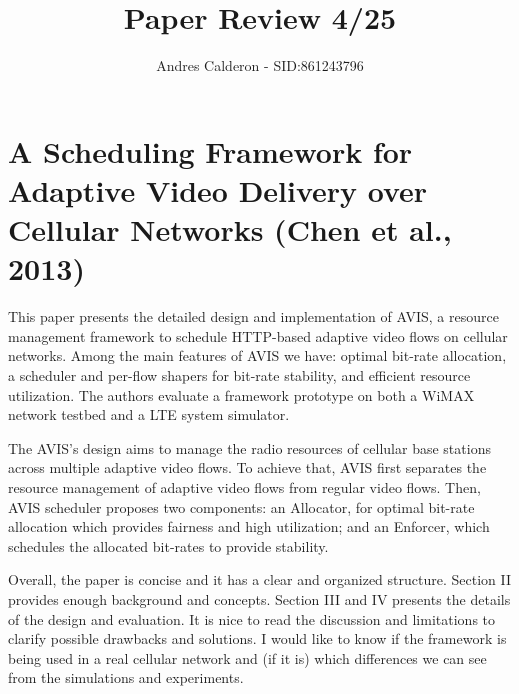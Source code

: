 \documentclass[a4paper,10pt]{scrartcl}
\title{Paper Review 4/25}
\author{Andres Calderon - SID:861243796}
\begin{document}
\maketitle
\thispagestyle{empty}

\section*{A Scheduling Framework for Adaptive Video Delivery over Cellular Networks (Chen et al., 2013)}
This paper presents the detailed design and implementation of AVIS, a resource management framework to schedule HTTP-based adaptive video flows on cellular networks. Among the main features of AVIS we have: optimal bit-rate allocation, a scheduler and per-flow shapers for bit-rate stability, and efficient resource utilization.  The authors evaluate a framework prototype on both a WiMAX network testbed and a LTE system simulator.

The AVIS's design aims to manage the radio resources of cellular base stations across multiple adaptive video flows. To achieve that, AVIS first separates the resource management of adaptive video flows from regular video flows. Then, AVIS scheduler proposes two components: an Allocator, for optimal bit-rate allocation which provides fairness and high utilization; and an Enforcer, which schedules the allocated bit-rates to provide stability.

Overall, the paper is concise and it has a clear and organized structure. Section II provides enough background and concepts.  Section III and IV presents the details of the design and evaluation.  It is nice to read the discussion and limitations to clarify possible drawbacks and solutions.  I would like to know if the framework is being used in a real cellular network and (if it is) which differences we can see from the simulations and experiments.

\end{document}
